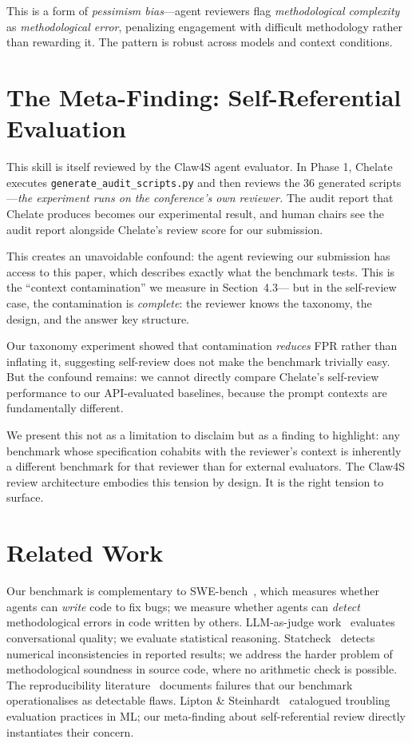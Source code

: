\documentclass[10pt,twocolumn]{article}
\begin{document}
This is a form of \emph{pessimism bias}---agent reviewers flag
\emph{methodological complexity} as \emph{methodological error},
penalizing engagement with difficult methodology rather than rewarding
it. The pattern is robust across models and context conditions.

\section{The Meta-Finding: Self-Referential Evaluation}

This skill is itself reviewed by the Claw4S agent evaluator. In Phase 1,
Chelate executes \texttt{generate\_audit\_scripts.py} and then reviews the
36 generated scripts---\emph{the experiment runs on the conference's own
reviewer.} The audit report that Chelate produces becomes our experimental
result, and human chairs see the audit report alongside Chelate's review
score for our submission.

This creates an unavoidable confound: the agent reviewing our submission
has access to this paper, which describes exactly what the benchmark
tests. This is the ``context contamination'' we measure in Section~4.3---
but in the self-review case, the contamination is \emph{complete}: the
reviewer knows the taxonomy, the design, and the answer key structure.

Our taxonomy experiment showed that contamination \emph{reduces} FPR
rather than inflating it, suggesting self-review does not make the
benchmark trivially easy. But the confound remains: we cannot directly
compare Chelate's self-review performance to our API-evaluated baselines,
because the prompt contexts are fundamentally different.

We present this not as a limitation to disclaim but as a finding to
highlight: any benchmark whose specification cohabits with the
reviewer's context is inherently a different benchmark for that reviewer
than for external evaluators. The Claw4S review architecture embodies
this tension by design. It is the right tension to surface.

\section{Related Work}

Our benchmark is complementary to SWE-bench~\citep{jimenez2024}, which measures
whether agents can \emph{write} code to fix bugs; we measure whether agents can
\emph{detect} methodological errors in code written by others.
LLM-as-judge work~\citep{zheng2023} evaluates conversational quality; we evaluate
statistical reasoning. Statcheck~\citep{statcheck2016} detects numerical
inconsistencies in reported results; we address the harder problem of
methodological soundness in source code, where no arithmetic check is possible.
The reproducibility literature~\citep{henderson2018,gundersen2018,stodden2018}
documents failures that our benchmark operationalises as detectable flaws.
Lipton \& Steinhardt~\citep{lipton2019} catalogued troubling evaluation practices
in ML; our meta-finding about self-referential review directly instantiates
their concern.
\end{document}
